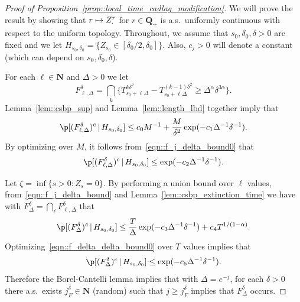 \documentclass[10pt]{amsart}
\newcommand\mto{\mathchoice{\longmapsto}{\mapsto}{\mapsto}{\mapsto}}
\theoremstyle{plain}
\numberwithin{theorem}{section}
\theoremstyle{definition}
\newcommand{\N}{\mathbf{N}}
\newcommand{\Q}{{\mathbf Q}}
\newcommand{\giv}{\,|\,}
\begin{document}
\begin{proof}[Proof of Proposition~\ref{prop::local_time_cadlag_modification}]
We will prove the result by showing that $r \mto Z_\cdot^r$ for $r \in \Q_+$ is a.s.\ uniformly continuous with respect to the uniform topology. Throughout, we assume that $s_0,\delta_0,\delta > 0$ are fixed and we let $H_{s_0,\delta_0} = \{ Z_{s_0} \in [\delta_0/2,\delta_0]\}$. Also, $c_j > 0$ will denote a constant (which can depend on $s_0,\delta_0,\delta$).

For each $\ell \in \N$ and $\Delta > 0$ we let\vspace*{-3pt}
\[
F_{\ell,\Delta}^{\delta} = \bigcap_k \bigl\{ T_{s_0+ \ell \Delta}^{k\delta^2} - T_{s_0+\ell \Delta}^{(k-1)\delta^2} \geq \Delta^{\alpha} \delta^{3\alpha} \bigr\}.
\]
Lemma~\ref{lem::csbp_sup} and Lemma~\ref{lem::length_lbd} together imply that\vspace*{-3pt}
\begin{equation}
\label{eqn::f_j_delta_bound0}
\p[ (F_{\ell,\Delta}^{\delta})^c \giv H_{s_0,\delta_0}] \leq c_0 M^{-1} + \frac{M}{\delta^2} \exp(-c_1 \Delta^{-1} \delta^{-1}).
\end{equation}
By optimizing over $M$, it follows from~\eqref{eqn::f_j_delta_bound0} that\vspace*{-3pt}
\begin{equation}
\label{eqn::f_j_delta_bound}
\p[ (F_{\ell,\Delta}^{\delta})^c \giv H_{s_0,\delta_0}] \leq \exp(-c_2 \Delta^{-1} \delta^{-1}).
\end{equation}

Let $\zeta = \inf\{ s > 0 : Z_s = 0\}$. By performing a union bound over $\ell$ values, from~\eqref{eqn::f_j_delta_bound} and Lemma~\ref{lem::csbp_extinction_time} we have with $F_\Delta^{\delta} = \bigcap_\ell F_{\ell,\Delta}^{\delta}$ that\vspace*{-3pt}
\begin{equation}
\label{eqn::f_delta_delta_bound0}
\p[ (F_\Delta^\delta)^c \giv H_{s_0,\delta_0}] \leq \frac{T}{\Delta} \exp(-c_3 \Delta^{-1} \delta^{-1}) + c_4 T^{1/(1-\alpha)}.
\end{equation}
Optimizing~\eqref{eqn::f_delta_delta_bound0} over $T$ values implies that
\begin{equation}
\label{eqn::f_delta_delta_bound}
\p[ (F_\Delta^\delta)^c \giv H_{s_0,\delta_0}] \leq \exp(-c_5 \Delta^{-1} \delta^{-1}).
\end{equation}
Therefore the Borel-Cantelli lemma implies that with $\Delta = e^{-j}$, for each $\delta > 0$ there a.s.\ exists $j_F^\delta \in \N$ (random) such that $j \geq j_F^\delta$ implies that $F_\Delta^\delta$ occurs.


\end{proof}
\end{document}

